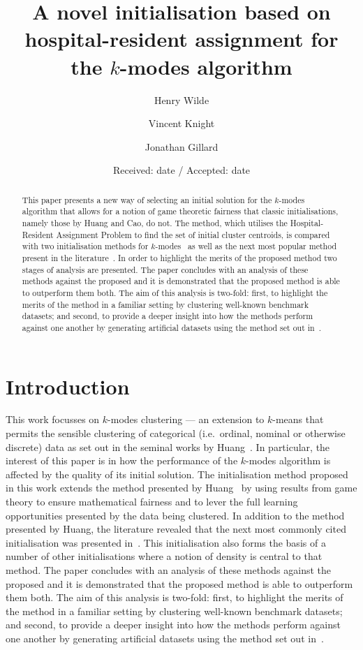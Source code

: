 \documentclass[smallextended]{svjour3}
\title{%
    A novel initialisation based on hospital-resident assignment for the
    \(k\)-modes algorithm
}
\author{Henry Wilde \and Vincent Knight \and Jonathan Gillard}
\institute{%
    School of Mathematics, Senghennydd Rd, Cardiff, WALES CF24 4AG \\
    \textit{\email{\{wildehd, knightva, gillardjw\}@cardiff.ac.uk}}
}
\date{Received: date / Accepted: date}
\begin{document}
\maketitle%
\begin{abstract}
    This paper presents a new way of selecting an initial solution for the
    \(k\)-modes algorithm that allows for a notion of game theoretic fairness
    that classic initialisations, namely those by Huang and Cao, do not. The
    method, which utilises the Hospital-Resident Assignment Problem to find the
    set of initial cluster centroids, is compared with two initialisation
    methods for \(k\)-modes~\cite{Cao2009} as well as the next most popular
    method present in the literature~\cite{Huang1998}. In order to highlight the
    merits of the proposed method two stages of analysis are presented. The
    paper concludes with an analysis of these methods against the proposed and
    it is demonstrated that the proposed method is able to outperform them both.
    The aim of this analysis is two-fold: first, to highlight the merits of the
    method in a familiar setting by clustering well-known benchmark datasets;
    and second, to provide a deeper insight into how the methods perform against
    one another by generating artificial datasets using the method set out
    in~\cite{Wilde2019}.

\end{abstract}

\section{Introduction}\label{sec:intro}

This work focusses on \(k\)-modes clustering --- an extension to \(k\)-means
that permits the sensible clustering of categorical (i.e.\ ordinal, nominal or
otherwise discrete) data as set out in the seminal works by
Huang~\cite{Huang1997a,Huang1997b,Huang1998}. In particular, the interest of
this paper is in how the performance of the \(k\)-modes algorithm is affected by
the quality of its initial solution. The initialisation method proposed in this
work extends the method presented by Huang~\cite{Huang1998} by using results
from game theory to ensure mathematical fairness and to lever the full learning
opportunities presented by the data being clustered. In addition to the method
presented by Huang, the literature revealed that the next most commonly cited
initialisation was presented in~\cite{Cao2009}. This initialisation also forms
the basis of a number of other initialisations where a notion of density is
central to that method. The paper concludes with an analysis of these methods
against the proposed and it is demonstrated that the proposed method is able to
outperform them both. The aim of this analysis is two-fold: first, to highlight
the merits of the method in a familiar setting by clustering well-known
benchmark datasets; and second, to provide a deeper insight into how the methods
perform against one another by generating artificial datasets using the method
set out in~\cite{Wilde2019}.
\end{document}

